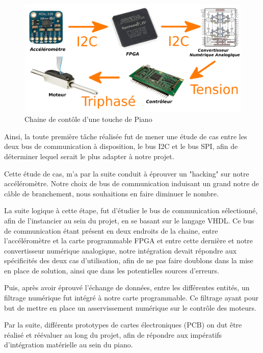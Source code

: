 \documentclass[french,a4paper,12pt]{report}
\begin{document}
	\begin{figure}[!ht]
    \center
  	\includegraphics[width=17cm]{CH.png}
    \caption{Chaine de contôle d'une touche de Piano}
	\end{figure}	
	
	Ainsi, la toute première tâche réalisée fut de mener une étude de cas entre les deux bus de communication à disposition, le bus I2C et le bus SPI, afin de déterminer lequel serait le plus adapter à notre projet.
	
	Cette étude de cas, m'a par la suite conduit à éprouver un "hacking" sur notre accéléromètre. Notre choix de bus de communication induisant un grand notre de câble de branchement, nous souhaitions en faire diminuer le nombre.
	
	La suite logique à cette étape, fut d'étudier le bus de communication sélectionné, afin de l'instancier au sein du projet, en se basant sur le langage VHDL. Ce bus de communication étant présent en deux endroits de la chaine, entre l'accéléromètre et la carte programmable FPGA et entre cette dernière et notre convertisseur numérique analogique, notre intégration devait répondre aux spécificités des deux cas d'utilisation, afin de ne pas faire doublons dans la mise en place de solution, ainsi que dans les potentielles sources d'erreurs.
	
	Puis, après avoir éprouvé l'échange de données, entre les différentes entités, un filtrage numérique fut intégré à notre carte programmable. Ce filtrage ayant pour but de mettre en place un asservissement numérique sur le contrôle des moteurs.

	Par la suite, différents prototypes de cartes électroniques (PCB) on dut être réalisé et réévaluer au long du projet, afin de répondre aux impératifs d'intégration matérielle au sein du piano.
	
\end{document}
